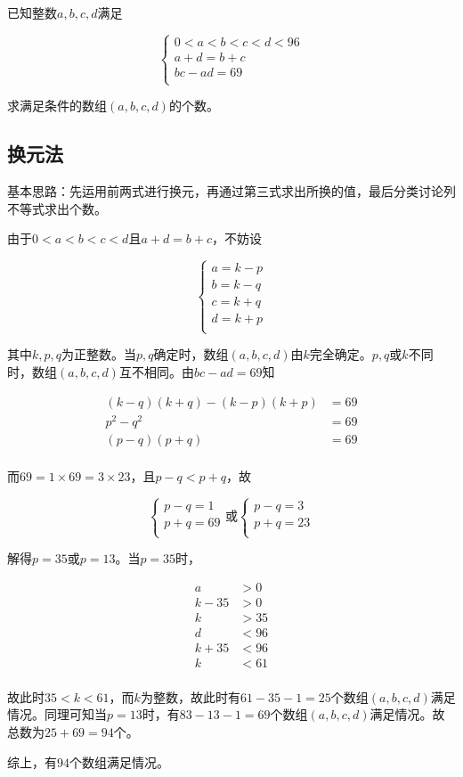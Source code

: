 

已知整数$a, b, c, d$满足

\[ \begin{cases}
  0 < a < b < c < d < 96 \\
  a + d = b + c \\
  bc - ad = 69 \\
\end{cases} \]

求满足条件的数组$(a, b, c, d)$的个数。


\subsection{换元法}

基本思路：先运用前两式进行换元，再通过第三式求出所换的值，最后分类讨论列不等式求出个数。

由于$0 < a < b < c < d$且$a + d = b + c$，不妨设

\[ \begin{cases}
  a = k - p \\
  b = k - q \\
  c = k + q \\
  d = k + p \\
\end{cases} \]

其中$k, p, q$为正整数。当$p, q$确定时，数组$(a, b, c, d)$由$k$完全确定。$p, q$或$k$不同时，数组$(a, b, c, d)$互不相同。由$bc - ad = 69$知

\begin{align*}
  (k - q)(k + q) - (k - p)(k + p) &= 69 \\
  p^2 - q^2 &= 69 \\
  (p - q)(p + q) &= 69 \\
\end{align*}

而$69 = 1\times69 = 3\times23$，且$p - q < p + q$，故

\[ \begin{cases}
  p - q = 1 \\
  p + q = 69 \\
\end{cases} \text{或} \begin{cases}
  p - q = 3 \\
  p + q = 23 \\
\end{cases} \]

解得$p = 35$或$p = 13$。当$p = 35$时，

\begin{align*}
  a &> 0 \\
  k - 35 &> 0 \\
  k &> 35 \\
  d &< 96 \\
  k + 35 &< 96 \\
  k &< 61 \\
\end{align*}

故此时$35 < k < 61$，而$k$为整数，故此时有$61 - 35 - 1 = 25$个数组$(a, b, c, d)$满足情况。同理可知当$p = 13$时，有$83 - 13 - 1 = 69$个数组$(a, b, c, d)$满足情况。故总数为$25 + 69 = 94$个。

综上，有$94$个数组满足情况。
